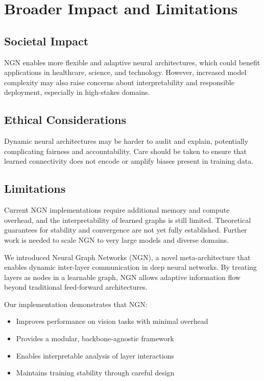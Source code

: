 \documentclass[11pt]{article}
\begin{document}
\section{Broader Impact and Limitations}

\subsection{Societal Impact}
NGN enables more flexible and adaptive neural architectures, which could benefit applications in healthcare, science, and technology. However, increased model complexity may also raise concerns about interpretability and responsible deployment, especially in high-stakes domains.

\subsection{Ethical Considerations}
Dynamic neural architectures may be harder to audit and explain, potentially complicating fairness and accountability. Care should be taken to ensure that learned connectivity does not encode or amplify biases present in training data.

\subsection{Limitations}
Current NGN implementations require additional memory and compute overhead, and the interpretability of learned graphs is still limited. Theoretical guarantees for stability and convergence are not yet fully established. Further work is needed to scale NGN to very large models and diverse domains.

We introduced Neural Graph Networks (NGN), a novel meta-architecture that enables dynamic inter-layer communication in deep neural networks. By treating layers as nodes in a learnable graph, NGN allows adaptive information flow beyond traditional feed-forward architectures.

Our implementation demonstrates that NGN:
\begin{itemize}
    \item Improves performance on vision tasks with minimal overhead
    \item Provides a modular, backbone-agnostic framework
    \item Enables interpretable analysis of layer interactions
    \item Maintains training stability through careful design
\end{itemize}
\end{document}
